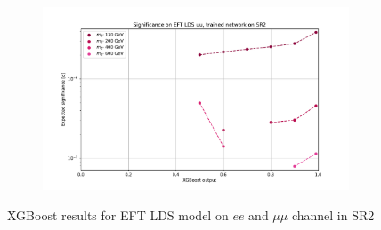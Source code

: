 \documentclass[12pt, a4paper]{book}
\begin{document}
\begin{figure}[!ht]
\begin{subfigure}[b]{0.49\textwidth}
   \end{subfigure}
   \hfill
   \begin{subfigure}[b]{0.49\textwidth}
      \centering
      \includegraphics[width=1\textwidth]{XGBoost/Model_independent/100-150/EFT_LDS/EXP_SIG_uu.pdf}
   \end{subfigure}
   \caption{XGBoost results for EFT LDS model on $ee$ and $\mu\mu$ channel in SR2}\label{fig:EFT_LDS_SR2}
\end{figure}
\end{document}
